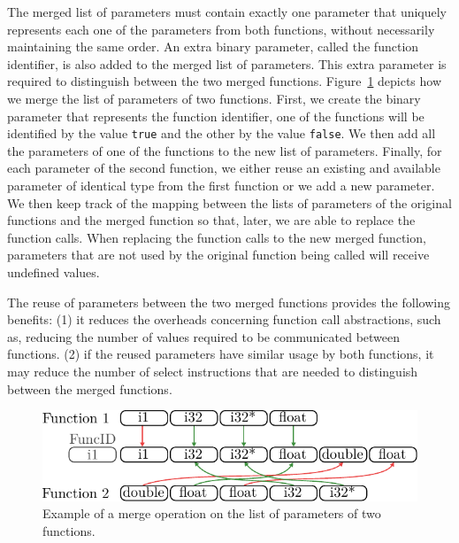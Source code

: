 The merged list of parameters must contain exactly one parameter that uniquely
represents each one of the parameters from both functions, without necessarily
maintaining the same order.
An extra binary parameter, called the function identifier, is also added to the
merged list of parameters.
This extra parameter is required to distinguish between the two merged functions.
Figure~\ref{fig:merged-params} depicts how we merge the list of parameters of
two functions.
First, we create the binary parameter that represents the function identifier,
one of the functions will be identified by the value \texttt{true} and the other
by the value \texttt{false}.
We then add all the parameters of one of the functions to the new list of
parameters.
Finally, for each parameter of the second function, we either reuse an existing
and available parameter of identical type from the first function or we add a
new parameter.
We then keep track of the mapping between the lists of parameters of the
original functions and the merged function so that, later, we are able to
replace the function calls.
When replacing the function calls to the new merged function, parameters that
are not used by the original function being called will receive undefined values.

The reuse of parameters between the two merged functions provides the following
benefits:
(1) it reduces the overheads concerning function call abstractions, such as,
reducing the number of values required to be communicated between functions.
(2) if the reused parameters have similar usage by both functions, it may reduce
the number of select instructions that are needed to distinguish between the
merged functions.

\begin{figure}[t!]
  \centering
  \includegraphics[width=0.9\linewidth]{figs/merged-params.pdf}
  \caption{Example of a merge operation on the list of parameters of two functions.}
  \label{fig:merged-params}
\end{figure}


